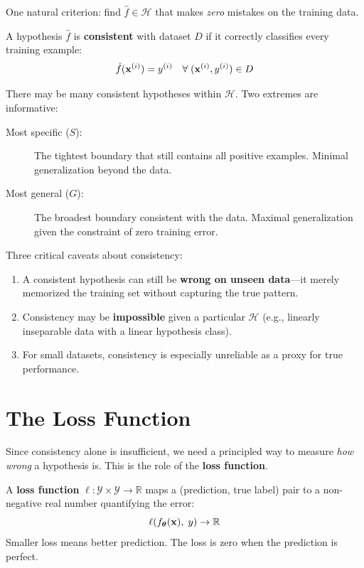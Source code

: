 One natural criterion: find $\hat{f} \in \mathcal{H}$ that makes \emph{zero} mistakes on the training data.

\begin{definition}
A hypothesis $\hat{f}$ is \textbf{consistent} with dataset $D$ if it correctly classifies every training example:
$$\hat{f}(\mathbf{x}^{(i)}) = y^{(i)} \quad \forall\; (\mathbf{x}^{(i)}, y^{(i)}) \in D$$
\end{definition}

There may be many consistent hypotheses within $\mathcal{H}$. Two extremes are informative:
\begin{description}
    \item[Most specific ($S$):] The tightest boundary that still contains all positive examples. Minimal generalization beyond the data.
    \item[Most general ($G$):] The broadest boundary consistent with the data. Maximal generalization given the constraint of zero training error.
\end{description}

\begin{remark}
Three critical caveats about consistency:
\begin{enumerate}
    \item A consistent hypothesis can still be \textbf{wrong on unseen data}---it merely memorized the training set without capturing the true pattern.
    \item Consistency may be \textbf{impossible} given a particular $\mathcal{H}$ (e.g., linearly inseparable data with a linear hypothesis class).
    \item For small datasets, consistency is especially unreliable as a proxy for true performance.
\end{enumerate}
\end{remark}

\section*{The Loss Function}

Since consistency alone is insufficient, we need a principled way to measure \emph{how wrong} a hypothesis is. This is the role of the \textbf{loss function}.

\begin{definition}
A \textbf{loss function} $\ell: \mathcal{Y} \times \mathcal{Y} \to \mathbb{R}$ maps a (prediction, true label) pair to a non-negative real number quantifying the error:
$$\ell\!\left(f_{\boldsymbol{\theta}}(\mathbf{x}),\; y\right) \to \mathbb{R}$$
Smaller loss means better prediction. The loss is zero when the prediction is perfect.
\end{definition}

